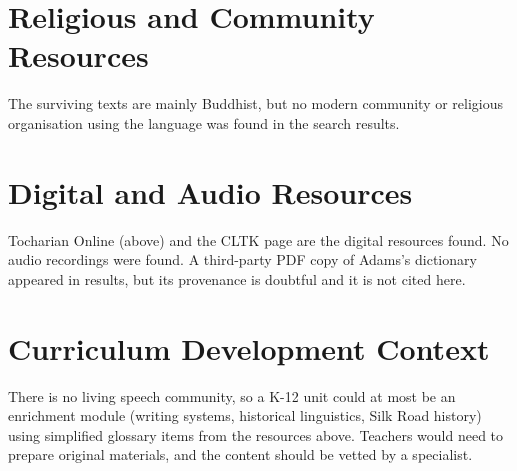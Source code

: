 \documentclass[12pt]{article}
\begin{document}
\section{Religious and Community Resources}
The surviving texts are mainly Buddhist, but no modern community or religious organisation using the language was found in the search results.

\section{Digital and Audio Resources}
Tocharian Online (above) and the CLTK page are the digital resources found. No audio recordings were found. A third-party PDF copy of Adams's dictionary appeared in results, but its provenance is doubtful and it is not cited here.

\section{Curriculum Development Context}
There is no living speech community, so a K-12 unit could at most be an enrichment module (writing systems, historical linguistics, Silk Road history) using simplified glossary items from the resources above. Teachers would need to prepare original materials, and the content should be vetted by a specialist.
\end{document}
